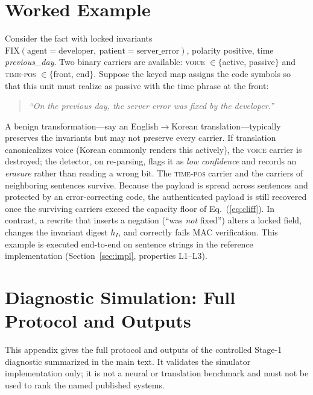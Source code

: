 \documentclass[11pt]{article}
\begin{document}
\section{Worked Example}
\label{sec:worked}
Consider the fact with locked invariants
$\mathrm{FIX}(\text{agent}{=}\text{developer},\ \text{patient}{=}\text{server\_error})$,
polarity positive, time \emph{previous\_day}. Two binary carriers are
available: \textsc{voice} $\in\{$active, passive$\}$ and \textsc{time-pos}
$\in\{$front, end$\}$. Suppose the keyed map assigns the code symbols so that
this unit must realize as passive with the time phrase at the front:
\begin{quote}\itshape
``On the previous day, the server error was fixed by the developer.''
\end{quote}
A benign transformation---say an English$\to$Korean translation---typically
preserves the invariants but may not preserve every carrier. If translation
canonicalizes voice (Korean commonly renders this actively), the \textsc{voice}
carrier is destroyed; the detector, on re-parsing, flags it as \emph{low
confidence} and records an \emph{erasure} rather than reading a wrong bit. The
\textsc{time-pos} carrier and the carriers of neighboring sentences survive.
Because the payload is spread across sentences and protected by an
error-correcting code, the authenticated payload is still recovered once the
surviving carriers exceed the capacity floor of Eq.~(\ref{eq:cliff}). In
contrast, a rewrite that inserts a negation (``was \emph{not} fixed'') alters a
locked field, changes the invariant digest $h_I$, and correctly fails MAC
verification. This example is executed end-to-end on sentence strings in the
reference implementation (Section~\ref{sec:impl}, properties L1--L3).

\section{Diagnostic Simulation: Full Protocol and Outputs}
\label{app:diagnostic}
This appendix gives the full protocol and outputs of the controlled
Stage-1 diagnostic summarized in the main text. It validates the simulator
implementation only; it is not a neural or translation benchmark and must
not be used to rank the named published systems.
\end{document}
